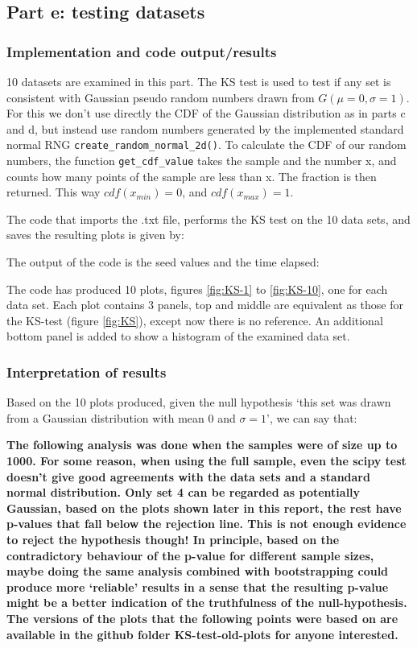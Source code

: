 \documentclass{article}
\begin{document}
\subsection{Part e: testing datasets}
\subsubsection{Implementation and code output/results}
10 datasets are examined in this part. The KS test is used to test if any set is consistent with Gaussian pseudo random numbers drawn from $G(\mu=0, \sigma=1)$. For this we don't use directly the CDF of the Gaussian distribution as in parts c and d, but instead use random numbers generated by the implemented standard normal RNG \verb+create_random_normal_2d()+.  To calculate the CDF of our random numbers, the function \verb+get_cdf_value+ takes the sample and the number x, and counts how many points of the sample are less than x. The fraction is then returned. This way $cdf(x_{min})=0$, and $cdf(x_{max})=1$. 

The code that imports the .txt file, performs the KS test on the 10 data sets, and saves the resulting plots is given by:


The output of the code is the seed values and the time elapsed:


The code has produced 10 plots, figures \ref{fig:KS-1} to \ref{fig:KS-10}, one for each data set. Each plot contains 3 panels, top and middle are equivalent as those for the KS-test (figure \ref{fig:KS}), except now there is no reference. An additional bottom panel is added to show a histogram of the examined data set.

\subsubsection{Interpretation of results}
Based on the 10 plots produced, given the null hypothesis `this set was drawn from a Gaussian distribution with mean 0 and $\sigma = 1$', we can say that:

\textbf{The following analysis was done when the samples were of size up to 1000. For some reason, when using the full sample, even the scipy test doesn't give good agreements with the data sets and a standard normal distribution. Only set 4 can be regarded as potentially Gaussian, based on the plots shown later in this report, the rest have p-values that fall below the rejection line. This is not enough evidence to reject the hypothesis though! In principle, based on the contradictory behaviour of the p-value for different sample sizes, maybe doing the same analysis combined with bootstrapping could produce more `reliable' results in a sense that the resulting p-value might be a better indication of the truthfulness of the null-hypothesis. The versions of the plots that the following points were based on are available in the github folder KS-test-old-plots for anyone interested.}
\end{document}
